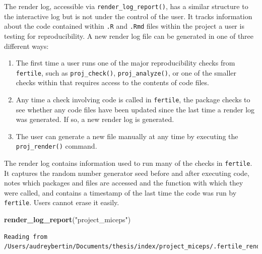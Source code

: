 \documentclass[12pt,twoside]{reedthesis}
\newenvironment{Shaded}{\begin{snugshade}}{\end{snugshade}}
\newcommand{\KeywordTok}[1]{\textcolor[rgb]{0.13,0.29,0.53}{\textbf{#1}}}
\newcommand{\StringTok}[1]{\textcolor[rgb]{0.31,0.60,0.02}{#1}}
\newcommand{\NormalTok}[1]{#1}
\begin{document}
The render log, accessible via \texttt{render\_log\_report()}, has a
similar structure to the interactive log but is not under the control of
the user. It tracks information about the code contained within
\texttt{.R} and \texttt{.Rmd} files within the project a user is testing
for reproducibility. A new render log file can be generated in one of
three different ways:
\begin{enumerate}
\def\labelenumi{\arabic{enumi}.}
\item
  The first time a user runs one of the major reproducibility checks
  from \texttt{fertile}, such as \texttt{proj\_check()},
  \texttt{proj\_analyze()}, or one of the smaller checks within that
  requires access to the contents of code files.
\item
  Any time a check involving code is called in \texttt{fertile}, the
  package checks to see whether any code files have been updated since
  the last time a render log was generated. If so, a new render log is
  generated.
\item
  The user can generate a new file manually at any time by executing the
  \texttt{proj\_render()} command.
\end{enumerate}
The render log contains information used to run many of the checks in
\texttt{fertile}. It captures the random number generator seed before
and after executing code, notes which packages and files are accessed
and the function with which they were called, and contains a timestamp
of the last time the code was run by \texttt{fertile}. Users cannot
erase it easily.
\begin{Shaded}
\begin{Highlighting}[]
\KeywordTok{render_log_report}\NormalTok{(}\StringTok{"project_miceps"}\NormalTok{)}
\end{Highlighting}
\end{Shaded}
\begin{verbatim}
Reading from /Users/audreybertin/Documents/thesis/index/project_miceps/.fertile_render_log.csv
\end{verbatim}
\end{document}

